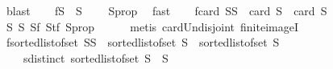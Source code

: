 \begin{isabellebody}
\ blast{\isacharplus}{\kern0pt}\isanewline
\isanewline
\ \ \isamarkupfalse%
\ f{}{}{\isacharunderscore}{\kern0pt}{}{\isacharcolon}{\kern0pt}{\isachardoublequoteopen}S{}\ {\isasyminter}\ S{}\ {\isacharequal}{\kern0pt}\ {\isacharbraceleft}{\kern0pt}{\isacharbraceright}{\kern0pt}{\isachardoublequoteclose}\ \isamarkupfalse%
\ S{}{\isacharunderscore}{\kern0pt}prop{\isacharparenleft}{\kern0pt}{}{\isacharparenright}{\kern0pt}\ \isamarkupfalse%
\ fast\isanewline
\ \ \isamarkupfalse%
\ f{}{}{\isacharunderscore}{\kern0pt}{}{\isacharcolon}{\kern0pt}{\isachardoublequoteopen}card\ {\isacharparenleft}{\kern0pt}S{}{\isasymunion}S{}{\isacharparenright}{\kern0pt}\ {\isacharequal}{\kern0pt}\ card\ S{}\ {\isacharplus}{\kern0pt}\ card\ S{}{\isachardoublequoteclose}\ \isamarkupfalse%
\ S{}{\isacharparenleft}{\kern0pt}{}{\isacharparenright}{\kern0pt}\ S{}{\isacharparenleft}{\kern0pt}{}{\isacharparenright}{\kern0pt}\ S{}f\ S{}tf\ S{}{\isacharunderscore}{\kern0pt}prop{\isacharparenleft}{\kern0pt}{}{\isacharparenright}{\kern0pt}\isanewline
\ \ \ \ \isamarkupfalse%
\ {\isacharparenleft}{\kern0pt}metis\ card{\isacharunderscore}{\kern0pt}Un{\isacharunderscore}{\kern0pt}disjoint\ finite{\isacharunderscore}{\kern0pt}imageI{\isacharparenright}{\kern0pt}\isanewline
\ \ \isamarkupfalse%
\ f{}{}{\isacharunderscore}{\kern0pt}{}{\isacharcolon}{\kern0pt}{\isachardoublequoteopen}sorted{\isacharunderscore}{\kern0pt}list{\isacharunderscore}{\kern0pt}of{\isacharunderscore}{\kern0pt}set\ {\isacharparenleft}{\kern0pt}S{}{\isasymunion}S{}{\isacharparenright}{\kern0pt}\ {\isacharequal}{\kern0pt}\ {\isacharparenleft}{\kern0pt}sorted{\isacharunderscore}{\kern0pt}list{\isacharunderscore}{\kern0pt}of{\isacharunderscore}{\kern0pt}set\ S{}{\isacharparenright}{\kern0pt}\ {\isacharat}{\kern0pt}\ {\isacharparenleft}{\kern0pt}sorted{\isacharunderscore}{\kern0pt}list{\isacharunderscore}{\kern0pt}of{\isacharunderscore}{\kern0pt}set\ S{}{\isacharparenright}{\kern0pt}{\isachardoublequoteclose}\isanewline
\ \ \ \ {\isachardoublequoteopen}sdistinct\ {\isacharparenleft}{\kern0pt}sorted{\isacharunderscore}{\kern0pt}list{\isacharunderscore}{\kern0pt}of{\isacharunderscore}{\kern0pt}set\ {\isacharparenleft}{\kern0pt}S{}\ {\isasymunion}\ S{}{\isacharparenright}{\kern0pt}{\isacharparenright}{\kern0pt}{\isachardoublequoteclose}\isanewline

\end{isabellebody}
